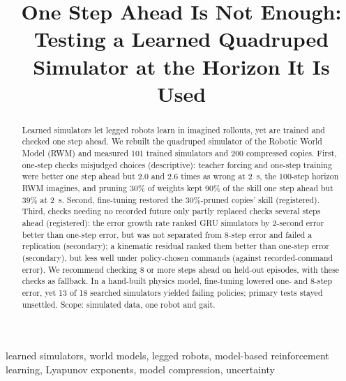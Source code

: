 \title{One Step Ahead Is Not Enough: Testing a Learned Quadruped Simulator at the Horizon It Is Used}
\author{\anonauthor}
\maketitle

\begin{abstract}
Learned simulators let legged robots learn in imagined rollouts, yet are trained and checked
one step ahead. We rebuilt the quadruped simulator of the Robotic World Model (RWM) and measured 101
trained simulators and 200 compressed copies. First, one-step checks misjudged choices
(descriptive): teacher forcing and one-step training were better one step ahead but 2.0 and
2.6 times as wrong at 2~s, the 100-step horizon RWM imagines, and pruning 30\% of
weights kept 90\% of the skill one step ahead but 39\% at 2~s. Second, fine-tuning restored the
30\%-pruned copies' skill (registered). Third, checks needing no recorded future only partly replaced checks several steps ahead
(registered): the error growth rate ranked GRU simulators by 2-second error better than one-step
error, but was not separated from 8-step error and failed a replication (secondary); a kinematic residual ranked them better than
one-step error (secondary), but less well under policy-chosen commands (against recorded-command error). We recommend checking 8 or more steps ahead on
held-out episodes, with these checks as fallback. In a hand-built physics model, fine-tuning lowered one- and 8-step
error, yet 13 of 18 searched simulators yielded failing policies; primary tests stayed unsettled. Scope: simulated data, one robot and gait.
\end{abstract}

\begin{IEEEkeywords}
learned simulators, world models, legged robots, model-based reinforcement learning, Lyapunov exponents,
model compression, uncertainty
\end{IEEEkeywords}

